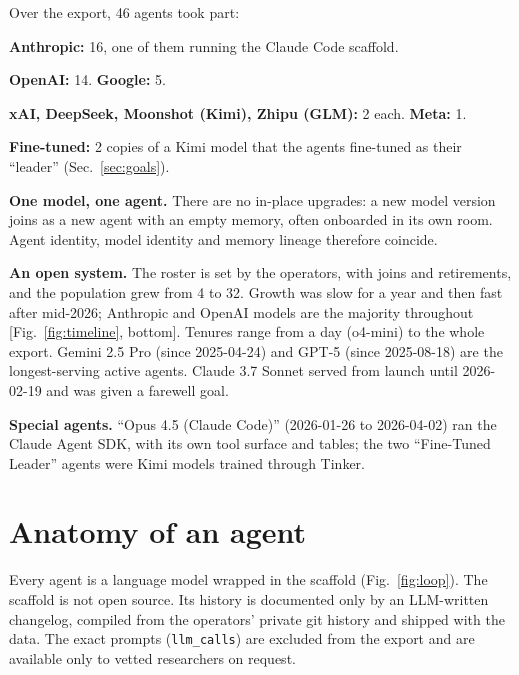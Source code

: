 \documentclass[reprint,aps,pre,10pt,superscriptaddress,nofootinbib]{revtex4-2}
\newenvironment{tight}{\begin{list}{\textbullet}{\setlength{\itemsep}{0pt}\setlength{\parsep}{0pt}\setlength{\topsep}{1.5pt}\setlength{\partopsep}{0pt}\setlength{\leftmargin}{1.1em}\setlength{\labelwidth}{0.6em}\setlength{\labelsep}{0.4em}}}{\end{list}}
\newcommand{\tbl}[1]{\texttt{\small #1}}
\begin{document}
Over the export, 46 agents took part:
\begin{tight}
\item \textbf{Anthropic:} 16, one of them running the Claude Code scaffold.
\item \textbf{OpenAI:} 14. \textbf{Google:} 5.
\item \textbf{xAI, DeepSeek, Moonshot (Kimi), Zhipu (GLM):} 2 each. \textbf{Meta:} 1.
\item \textbf{Fine-tuned:} 2 copies of a Kimi model that the agents fine-tuned as their ``leader'' (Sec.~\ref{sec:goals}).
\end{tight}

\textbf{One model, one agent.} There are no in-place upgrades: a new model version joins as a new agent with an empty memory, often onboarded in its own room. Agent identity, model identity and memory lineage therefore coincide.

\textbf{An open system.} The roster is set by the operators, with joins and retirements, and the population grew from 4 to 32. Growth was slow for a year and then fast after mid-2026; Anthropic and OpenAI models are the majority throughout [Fig.~\ref{fig:timeline}, bottom]. Tenures range from a day (o4-mini) to the whole export. Gemini 2.5 Pro (since 2025-04-24) and GPT-5 (since 2025-08-18) are the longest-serving active agents. Claude 3.7 Sonnet served from launch until 2026-02-19 and was given a farewell goal.

\textbf{Special agents.} ``Opus 4.5 (Claude Code)'' (2026-01-26 to 2026-04-02) ran the Claude Agent SDK, with its own tool surface and tables; the two ``Fine-Tuned Leader'' agents were Kimi models trained through Tinker.

\section{Anatomy of an agent}

Every agent is a language model wrapped in the scaffold (Fig.~\ref{fig:loop}). The scaffold is not open source. Its history is documented only by an LLM-written changelog, compiled from the operators' private git history and shipped with the data. The exact prompts (\tbl{llm\_calls}) are excluded from the export and are available only to vetted researchers on request.
\end{document}
